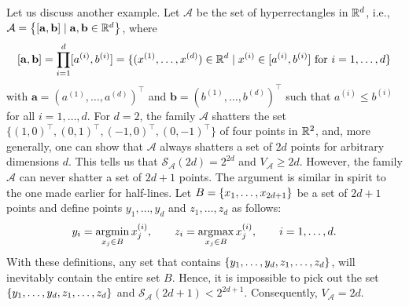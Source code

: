 Let us discuss another example. Let $\mathcal{A}$ be the set of hyperrectangles in $\mathbb{R}^d$, i.e., $\mathcal{A} = \set{[\mathbf{a}, \mathbf{b}] \with \mathbf{a}, \mathbf{b} \in \R^d}$, where
\[
    [\mathbf{a}, \mathbf{b}] = \prod_{i=1}^d [a^{(i)}, b^{(i)}] = \{(x^{(1)}, \dots, x^{(d)}) \in \mathbb{R}^d \mathrel{|} x^{(i)} \in [a^{(i)}, b^{(i)}] \text{ for } i = 1, \dots, d\}
\]
with $\mathbf{a} = (a^{(1)}, \dots, a^{(d)})^{\top}$ and $\mathbf{b} = (b^{(1)}, \dots, b^{(d)})^{\top}$ such that $a^{(i)} \leq b^{(i)}$ for all $i = 1, \dots, d$. For $d=2$, the family $\mathcal{A}$ shatters the set $\{(1, 0)^{\top}, (0, 1)^{\top}, (-1, 0)^{\top}, (0, -1)^{\top}\}$ of four points in $\mathbb{R}^2$, and, more generally, one can show that $\mathcal{A}$ always shatters a set of $2d$ points for arbitrary dimensions $d$. This tells us that $\mathcal{S}_{\mathcal{A}}(2d) = 2^{2d}$ and $V_{\mathcal{A}} \geq 2d$. However, the family $\mathcal{A}$ can never shatter a set of $2d + 1$ points. The argument is similar in spirit to the one made earlier for half-lines. Let $B = \set{x_1, \dots, x_{2d+1}}$ be a set of $2d + 1$ points and define points $y_1, \dots, y_d$ and $z_1, \dots, z_d$ as follows:
\[
    y_i = \operatorname*{argmin}_{x_j \in B} x_j^{(i)}, \qquad z_i = \operatorname*{argmax}_{x_j \in B} x_j^{(i)}, \qquad i = 1, \dots, d.
\]
With these definitions, any set that contains $\set{y_1, \dots, y_d, z_1, \dots, z_d}$, will inevitably contain the entire set $B$. Hence, it is impossible to pick out the set $\set{y_1, \dots, y_d, z_1, \dots, z_d}$ and $\mathcal{S}_{\mathcal{A}}(2d + 1) < 2^{2d + 1}$. Consequently, $V_{\mathcal{A}} = 2d$.
